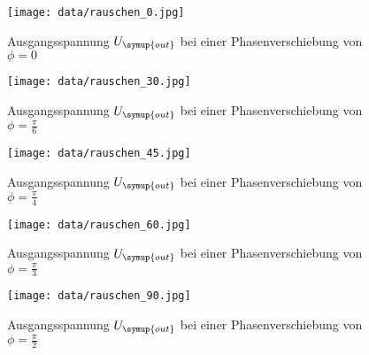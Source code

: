 \begin{figure}
  \centering
  \texttt{[image: data/rauschen\_0.jpg]}
  \caption{Ausgangsspannung $U_{\symup{out}}$ bei einer Phasenverschiebung
  von $\phi=0$}
  \label{fig:rauschen_0}
\end{figure}

\begin{figure}
  \centering
  \texttt{[image: data/rauschen\_30.jpg]}
  \caption{Ausgangsspannung $U_{\symup{out}}$ bei einer Phasenverschiebung
  von $\phi=\frac{\pi}{6}$}
  \label{fig:phase_30}
\end{figure}

\begin{figure}
  \centering
  \texttt{[image: data/rauschen\_45.jpg]}
  \caption{Ausgangsspannung $U_{\symup{out}}$ bei einer Phasenverschiebung
  von $\phi=\frac{\pi}{4}$}
  \label{fig:phase_45}
\end{figure}

\begin{figure}
  \centering
  \texttt{[image: data/rauschen\_60.jpg]}
  \caption{Ausgangsspannung $U_{\symup{out}}$ bei einer Phasenverschiebung
  von $\phi=\frac{\pi}{3}$}
  \label{fig:phase_60}
\end{figure}

\begin{figure}
  \centering
  \texttt{[image: data/rauschen\_90.jpg]}
  \caption{Ausgangsspannung $U_{\symup{out}}$ bei einer Phasenverschiebung
  von $\phi=\frac{\pi}{2}$}
  \label{fig:phase_90}
\end{figure}
